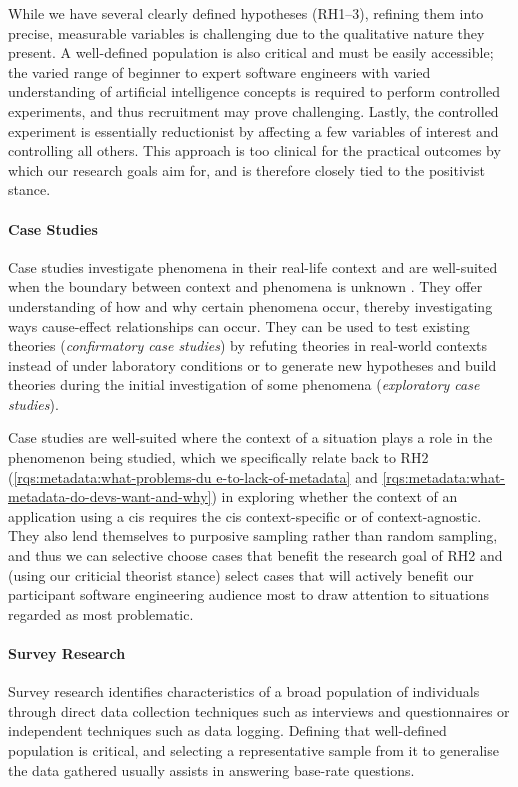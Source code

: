 While we have several clearly defined hypotheses (RH1--3), refining them into precise, measurable variables is challenging due to the qualitative nature they present. A well-defined population is also critical and must be easily accessible; the varied range of beginner to expert software engineers with varied understanding of artificial intelligence concepts is required to perform controlled experiments, and thus recruitment may prove challenging. Lastly, the controlled experiment is essentially reductionist by affecting a few variables of interest and controlling all others. This approach is too clinical for the practical outcomes by which our research goals aim for, and is therefore closely tied to the positivist stance.

\paragraph{Case Studies}
Case studies investigate phenomena in their real-life context and are well-suited when the boundary between context and phenomena is unknown . They offer understanding of how and why certain phenomena occur, thereby investigating ways cause-effect relationships can occur. They can be used to test existing theories (\textit{confirmatory case studies}) by refuting theories in real-world contexts instead of under laboratory conditions or to generate new hypotheses and build theories during the initial investigation of some phenomena (\textit{exploratory case studies}).

Case studies are well-suited where the context of a situation plays a role in the phenomenon being studied, which we specifically relate back to RH2 (\ref{rqs:metadata:what-problems-du                                                                e-to-lack-of-metadata} and \ref{rqs:metadata:what-metadata-do-devs-want-and-why}) in exploring whether the context of an application using a \gls{cis} requires the \gls{cis} context-specific or of context-agnostic. They also lend themselves to purposive sampling rather than random sampling, and thus we can selective choose cases that benefit the research goal of RH2 and (using our criticial theorist stance) select cases that will actively benefit our participant software engineering audience most to draw attention to situations regarded as most problematic.

\paragraph{Survey Research}
Survey research identifies characteristics of a broad population of individuals through direct data collection techniques such as interviews and questionnaires or independent techniques such as data logging. Defining that well-defined population is critical, and selecting a representative sample from it to generalise the data gathered usually assists in answering base-rate questions.

